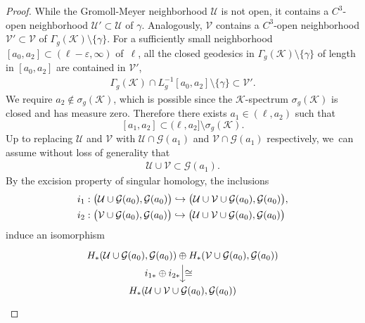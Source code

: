 \documentclass[JEP,XML,SOM,Unicode,NoFloatCountersInSection,published]{cedram}
\let\ts\textstyle
\let\epsilon\varepsilon
\newcommand\hto{\mathrel{\lhook\joinrel\to}}
\newcommand{\GG}{\mathcal{G}}
\newcommand{\KK}{\mathcal{K}}
\newcommand{\UU}{\mathcal{U}}
\newcommand{\VV}{\mathcal{V}}
\theoremstyle{plain}
\theoremstyle{definition}
\begin{document}
\begin{proof}
While the Gromoll-Meyer neighborhood $\UU$ is not open, it contains a $C^3$-open neighborhood $\UU'\subset\UU$ of $\gamma$. Analogously, $\VV$ contains a $C^3$-open neighborhood $\VV'\subset\VV$ of $\Gamma_g(\KK)\setminus\{\gamma\}$.
For a sufficiently small neighborhood $[a_0,a_2]\subset(\ell-\epsilon,\infty)$ of~$\ell$, all the closed geodesics in $\Gamma_g(\KK)\setminus\{\gamma\}$ of length in $[a_0,a_2]$ are contained in $\VV'$, \ie
\begin{align*}
\Gamma_g(\KK)\cap L_g^{-1}[a_0,a_2]\setminus\{\gamma\}\subset\VV'.
\end{align*}
We require $a_2\not\in\sigma_g(\KK)$, which is possible since the $\KK$-spectrum $\sigma_g(\KK)$ is closed and has measure zero. Therefore there exists $a_1\in(\ell,a_2)$ such that
\[
[a_1,a_2]\subset(\ell,a_2]\setminus\sigma_g(\KK).
\]
Up to replacing $\UU$ and $\VV$ with $\UU\cap\GG(a_1)$ and $\VV\cap\GG(a_1)$ respectively, we~can assume without loss of generality that
\begin{align*}
\UU\cup\VV\subset\GG(a_1).
\end{align*}
By the excision property of singular homology, the inclusions
\begin{align*}
&i_1:\big(\UU\cup\GG(a_0) , \GG(a_0)\big)
\hto
\big(\UU\cup\VV\cup\GG(a_0) , \GG(a_0)\big),\\
&i_2:\big(\VV\cup\GG(a_0) , \GG(a_0)\big)
\hto
\big(\UU\cup\VV\cup\GG(a_0) , \GG(a_0)\big)
\end{align*}
induce an isomorphism
\begin{equation}
\label{e:GM_splitting}
\begin{tikzcd}
H_*(\UU\cup\GG(a_0) , \GG(a_0))
\oplus
H_*(\VV\cup\GG(a_0) , \GG(a_0))
\arrow[d,"\ts \cong","\ts i_{1*}\oplus i_{2*}"']\\
H_*(\UU\cup\VV\cup\GG(a_0) , \GG(a_0))
\end{tikzcd}
\end{equation}


\end{proof}
\end{document}
